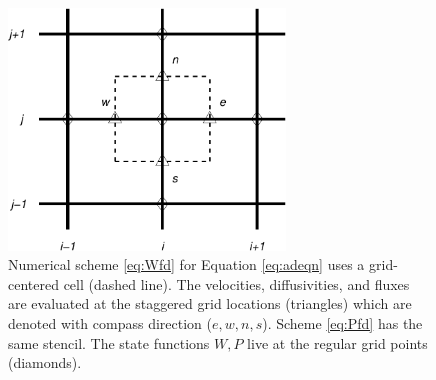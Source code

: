 \documentclass[11pt,final]{amsart}%
\begin{document}
\begin{figure}[ht]
\centering
\includegraphics[width=2.9in,keepaspectratio=true]{figs/diffstencil}
\bigskip
\caption{Numerical scheme \eqref{eq:Wfd} for Equation \eqref{eq:adeqn} uses a grid-centered cell (dashed line).  The velocities, diffusivities, and fluxes are evaluated at the staggered grid locations (triangles) which are denoted with compass direction ($e,w,n,s$).  Scheme \eqref{eq:Pfd} has the same stencil.  The state functions $W,P$ live at the regular grid points (diamonds).}
\label{fig:stencil}
\end{figure}
\end{document}
